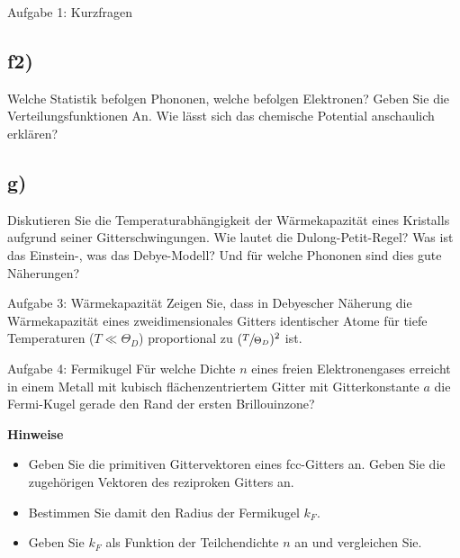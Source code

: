 \begin{aufgabe}{Aufgabe 1: Kurzfragen}
    \subsection{f2)} %
    Welche Statistik befolgen Phononen, welche befolgen Elektronen?
    Geben Sie die Verteilungsfunktionen An.
    Wie lässt sich das chemische Potential anschaulich erklären?

    \subsection{g)}
    Diskutieren Sie die Temperaturabhängigkeit der Wärmekapazität eines Kristalls aufgrund seiner Gitterschwingungen.
    Wie lautet die Dulong-Petit-Regel?
    Was ist das Einstein-, was das Debye-Modell?
    Und für welche Phononen sind dies gute Näherungen?
\end{aufgabe}

\begin{aufgabe}{Aufgabe 3: Wärmekapazität}
    Zeigen Sie, dass in Debyescher Näherung
    die Wärmekapazität eines zweidimensionales Gitters identischer Atome
    für tiefe Temperaturen ($T \ll \Theta_D$) proportional zu $(\sfrac{T}{\Theta_D})^2$ ist.
\end{aufgabe}

\begin{aufgabe}{Aufgabe 4: Fermikugel}
    Für welche Dichte $n$ eines freien Elektronengases erreicht in einem Metall mit kubisch flächenzentriertem Gitter mit Gitterkonstante $a$ die Fermi-Kugel gerade den Rand der ersten Brillouinzone?

    \textbf{Hinweise}
    \begin{itemize}
        \item Geben Sie die primitiven Gittervektoren eines fcc-Gitters an.
              Geben Sie die zugehörigen Vektoren des reziproken Gitters an.
        \item Bestimmen Sie damit den Radius der Fermikugel $k_F$.
        \item Geben Sie $k_F$ als Funktion der Teilchendichte $n$ an und vergleichen Sie.
    \end{itemize}
\end{aufgabe}


